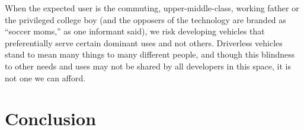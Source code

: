 
When the
expected user is the commuting, upper-middle-class, working father or
the privileged college boy (and the opposers of the technology are
branded as ``soccer moms,'' as one informant said), we risk developing
vehicles that preferentially serve certain dominant uses and not
others. Driverless vehicles stand to mean many things to many
different people, and though this blindness to other needs and uses may not be
shared by all developers in this space, it is not one we can afford.


\section{Conclusion}



